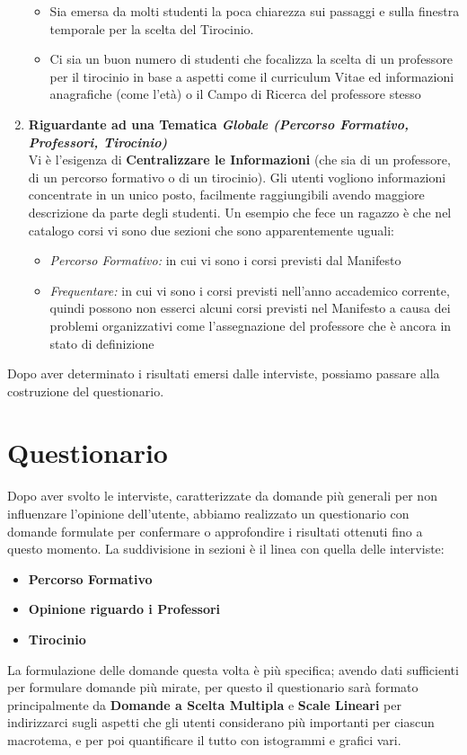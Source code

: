 \begin{enumerate}
\begin{itemize}
        \item Sia emersa da molti studenti la poca chiarezza sui passaggi e sulla finestra temporale per la scelta del Tirocinio.
        \item Ci sia un buon numero di studenti che focalizza la scelta di un professore per il tirocinio in base a aspetti come il curriculum Vitae ed informazioni anagrafiche (come l'età) o il Campo di Ricerca del professore stesso
    \end{itemize}  
    \item \textbf{Riguardante ad una Tematica \textit{Globale (Percorso Formativo, Professori, Tirocinio)}}\\
    Vi è l'esigenza di \textbf{Centralizzare le Informazioni} (che sia di un professore, di un percorso formativo o di un tirocinio).
    Gli utenti vogliono informazioni concentrate in un unico posto, facilmente raggiungibili avendo maggiore descrizione da parte degli studenti.
    Un esempio che fece un ragazzo è che nel catalogo corsi vi sono due sezioni che sono apparentemente uguali: 
    \begin{itemize}
        \item \textit{Percorso Formativo:} in cui vi sono i corsi previsti dal Manifesto
        \item \textit{Frequentare:} in cui vi sono i corsi previsti nell'anno accademico corrente, quindi possono non esserci alcuni corsi previsti nel Manifesto a causa dei problemi organizzativi come l'assegnazione del professore che è ancora in stato di definizione 
    \end{itemize}
    
\end{enumerate}

Dopo aver determinato i risultati emersi dalle interviste, possiamo passare alla costruzione del questionario.



\section{Questionario}

Dopo aver svolto le interviste, caratterizzate da domande più generali per non influenzare l'opinione dell'utente, abbiamo realizzato un questionario
con domande formulate per confermare o approfondire i risultati ottenuti fino a questo momento. La suddivisione in sezioni è il linea con quella delle interviste:
\begin{itemize}
    \item \textbf{Percorso Formativo}
    \item \textbf{Opinione riguardo i Professori}
    \item \textbf{Tirocinio}
\end{itemize}
La formulazione delle domande questa volta è più specifica;
avendo dati sufficienti per formulare domande più mirate, per questo
il questionario sarà formato principalmente da \textbf{Domande a Scelta Multipla} e \textbf{Scale Lineari} per indirizzarci sugli aspetti che gli utenti considerano più importanti per ciascun macrotema, e per poi quantificare il tutto con istogrammi e grafici vari.

